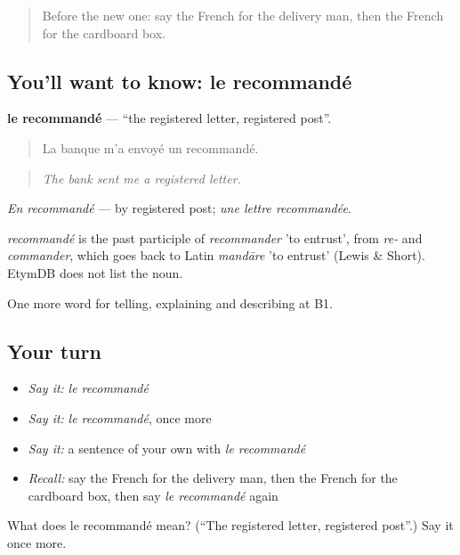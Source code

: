 \label{lesson:FR-C453-recommande}



\begin{quote}
Before the new one: say the French for the delivery man, then the French for the cardboard box.
\end{quote}

\subsection*{You'll want to know: le recommandé}
\textbf{le recommandé} — \textquotedblleft{}the registered letter, registered post\textquotedblright{}.

\begin{quote}
La banque m'a envoyé un recommandé.
\end{quote}

\begin{quote}
\emph{The bank sent me a registered letter.}
\end{quote}

\emph{En recommandé} — by registered post; \emph{une lettre recommandée}.

\begin{cousinweb}
\emph{recommandé} is the past participle of \emph{recommander} 'to entrust', from \emph{re-} and \emph{commander}, which goes back to Latin \emph{mandāre} 'to entrust' (Lewis \& Short). EtymDB does not list the noun.
\end{cousinweb}

\begin{grammarlens}[title={What you've built}]
One more word for telling, explaining and describing at B1.
\end{grammarlens}

\subsection*{Your turn}
\begin{itemize}
\raggedright
  \item \emph{Say it:} \emph{le recommandé}
  \item \emph{Say it:} \emph{le recommandé}, once more
  \item \emph{Say it:} a sentence of your own with \emph{le recommandé}
  \item \emph{Recall:} say the French for the delivery man, then the French for the cardboard box, then say \emph{le recommandé} again
\end{itemize}

\begin{tcolorbox}[breakable,colback=teal!4,colframe=teal!35!black,title={Before you move on}]
What does le recommandé mean? (\textquotedblleft{}The registered letter, registered post\textquotedblright{}.) Say it once more.
\end{tcolorbox}
